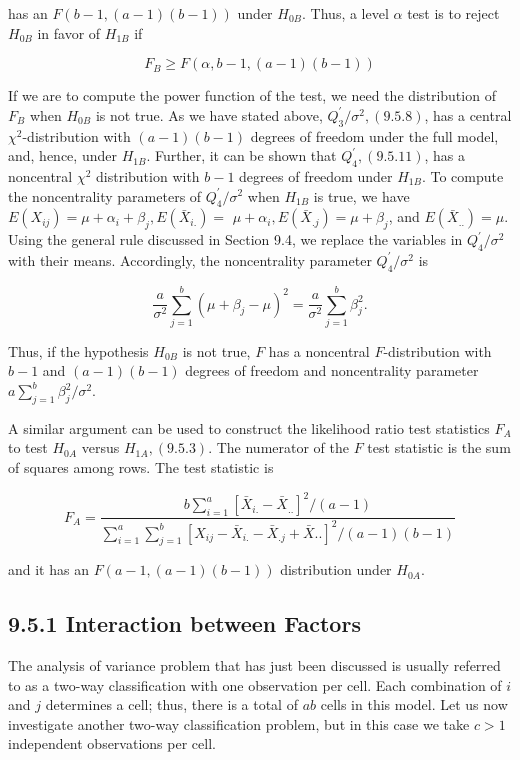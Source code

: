 has an $F(b-1,(a-1)(b-1))$ under $H_{0 B}$. Thus, a level $\alpha$ test is to reject $H_{0 B}$ in favor of $H_{1 B}$ if


\begin{equation*}
F_{B} \geq F(\alpha, b-1,(a-1)(b-1)) \tag{9.5.13}
\end{equation*}


If we are to compute the power function of the test, we need the distribution of $F_{B}$ when $H_{0 B}$ is not true. As we have stated above, $Q_{3}^{\prime} / \sigma^{2},(9.5 .8)$, has a central $\chi^{2}$-distribution with $(a-1)(b-1)$ degrees of freedom under the full model, and, hence, under $H_{1 B}$. Further, it can be shown that $Q_{4}^{\prime},(9.5 .11)$, has a noncentral $\chi^{2}$ distribution with $b-1$ degrees of freedom under $H_{1 B}$. To compute the noncentrality parameters of $Q_{4}^{\prime} / \sigma^{2}$ when $H_{1 B}$ is true, we have $E\left(X_{i j}\right)=\mu+\alpha_{i}+\beta_{j}, E\left(\bar{X}_{i .}\right)=$ $\mu+\alpha_{i}, E\left(\bar{X}_{. j}\right)=\mu+\beta_{j}$, and $E\left(\bar{X}_{. .}\right)=\mu$. Using the general rule discussed in Section 9.4, we replace the variables in $Q_{4}^{\prime} / \sigma^{2}$ with their means. Accordingly, the noncentrality parameter $Q_{4}^{\prime} / \sigma^{2}$ is

$$
\frac{a}{\sigma^{2}} \sum_{j=1}^{b}\left(\mu+\beta_{j}-\mu\right)^{2}=\frac{a}{\sigma^{2}} \sum_{j=1}^{b} \beta_{j}^{2} .
$$

Thus, if the hypothesis $H_{0 B}$ is not true, $F$ has a noncentral $F$-distribution with $b-1$ and $(a-1)(b-1)$ degrees of freedom and noncentrality parameter $a \sum_{j=1}^{b} \beta_{j}^{2} / \sigma^{2}$.

A similar argument can be used to construct the likelihood ratio test statistics $F_{A}$ to test $H_{0 A}$ versus $H_{1 A},(9.5 .3)$. The numerator of the $F$ test statistic is the sum of squares among rows. The test statistic is


\begin{equation*}
F_{A}=\frac{b \sum_{i=1}^{a}\left[\bar{X}_{i .}-\bar{X}_{. .}\right]^{2} /(a-1)}{\sum_{i=1}^{a} \sum_{j=1}^{b}\left[X_{i j}-\bar{X}_{i .}-\bar{X}_{. j}+\bar{X} . .\right]^{2} /(a-1)(b-1)} \tag{9.5.14}
\end{equation*}


and it has an $F(a-1,(a-1)(b-1))$ distribution under $H_{0 A}$.

\subsection*{9.5.1 Interaction between Factors}
The analysis of variance problem that has just been discussed is usually referred to as a two-way classification with one observation per cell. Each combination of $i$ and $j$ determines a cell; thus, there is a total of $a b$ cells in this model. Let us now investigate another two-way classification problem, but in this case we take $c>1$ independent observations per cell.

